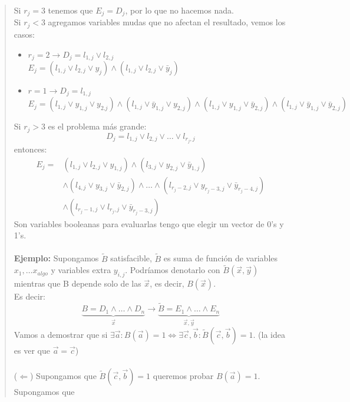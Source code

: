 \documentclass[11pt, a4paper]{article}
\theoremstyle{definition}
\begin{document}
\begin{quote}
    Si $r_j = 3$ tenemos que $E_j = D_j$, por lo que no hacemos nada.\\
    Si $r_j < 3$ agregamos variables mudas que no afectan el resultado, vemos los casos:
        \begin{itemize}
            \item $r_j = 2 \rightarrow D_j = l_{1,j} \vee l_{2,j}$\\
                  $E_j = (l_{1,j} \vee l_{2,j} \vee y_j) \wedge (l_{1,j} \vee l_{2,j} \vee \bar{y}_j)$
            \item $r = 1 \rightarrow D_j = l_{1,j}$\\
                  $E_j = (l_{1,j} \vee y_{1,j} \vee y_{2.j}) \wedge (l_{1,j} \vee \bar{y}_{1,j} \vee y_{2,j}) \wedge (l_{1,j} \vee y_{1,j} \vee \bar{y}_{2,j}) \wedge (l_{1,j} \vee \bar{y}_{1,j} \vee \bar{y}_{2,j})$
            \end{itemize}
    Si $r_j > 3$ es el problema más grande:
    \[
        D_j = l_{1,j} \vee l_{2,j} \vee \ldots \vee l_{r_j,j}
    \]
    entonces:
    \begin{align*}
        E_j = &(l_{1,j} \vee l_{2,j} \vee y_{1,j}) \wedge (l_{3,j} \vee y_{2,j} \vee \bar{y}_{1,j}) \\
              &\wedge (l_{4,j} \vee y_{3,j} \vee \bar{y}_{2,j}) \wedge \ldots \wedge (l_{r_j-2,j} \vee y_{r_j-3,j} \vee \bar{y}_{r_j-4,j}) \\
              &\wedge (l_{r_j-1,j} \vee l_{r_j,j} \vee \bar{y}_{r_j-3,j})
    \end{align*}
    Son variables booleanas para evaluarlas tengo que elegir un vector de 0's y 1's.\\ \\
    \textbf{Ejemplo:} Supongamos $\tilde{B}$ satisfacible, $\tilde{B}$ es suma de función de variables $x_1,\ldots x_{algo}$ y
    variables extra $y_{i,j}$. Podríamos denotarlo con $\tilde{B}(\vec{x}, \vec{y})$ mientras que B depende solo de
    las $\vec{x}$, es decir, $B(\vec{x})$.\\
    Es decir:
    \[
        \underbrace{B = D_1 \wedge \ldots \wedge D_n}_{\vec{x}}
        \rightarrow 
        \underbrace{\tilde{B} = E_1 \wedge \ldots \wedge E_n}_{\vec{x},\vec{y}}
    \]
    Vamos a demostrar que si $\exists \vec{a} : B(\vec{a}) = 1 \Leftrightarrow \exists \vec{c}, \vec{b} : \tilde{B}(\vec{c}, \vec{b}) = 1$. (la idea es ver
    que $\vec{a} = \vec{c}$)\\ \\
    ($\Leftarrow$) Supongamos que $\tilde{B}(\vec{c}, \vec{b}) = 1$ queremos probar $B(\vec{a}) = 1$. Supongamos que

\end{quote}
\end{document}
